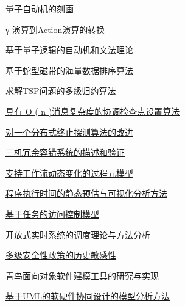 \documentclass[a4paper]{article}
\begin{document}
\href{http://www.jos.org.cn/ch/reader/download_pdf.aspx?file_no=20030102&year_id=2003&quarter_id=1&falg=1}{量子自动机的刻画}

\href{http://www.jos.org.cn/ch/reader/download_pdf.aspx?file_no=20030103&year_id=2003&quarter_id=1&falg=1}{γ 演算到Action演算的转换}

\href{http://www.jos.org.cn/ch/reader/download_pdf.aspx?file_no=20030104&year_id=2003&quarter_id=1&falg=1}{基于量子逻辑的自动机和文法理论}

\href{http://www.jos.org.cn/ch/reader/download_pdf.aspx?file_no=20030105&year_id=2003&quarter_id=1&falg=1}{基于蛇型磁带的海量数据排序算法}

\href{http://www.jos.org.cn/ch/reader/download_pdf.aspx?file_no=20030106&year_id=2003&quarter_id=1&falg=1}{求解TSP问题的多级归约算法}

\href{http://www.jos.org.cn/ch/reader/download_pdf.aspx?file_no=20030107&year_id=2003&quarter_id=1&falg=1}{具有 O ( n )消息复杂度的协调检查点设置算法}

\href{http://www.jos.org.cn/ch/reader/download_pdf.aspx?file_no=20030108&year_id=2003&quarter_id=1&falg=1}{对一个分布式终止探测算法的改进}

\href{http://www.jos.org.cn/ch/reader/download_pdf.aspx?file_no=20030109&year_id=2003&quarter_id=1&falg=1}{三机冗余容错系统的描述和验证}

\href{http://www.jos.org.cn/ch/reader/download_pdf.aspx?file_no=20030110&year_id=2003&quarter_id=1&falg=1}{支持工作流动态变化的过程元模型}

\href{http://www.jos.org.cn/ch/reader/download_pdf.aspx?file_no=20030111&year_id=2003&quarter_id=1&falg=1}{程序执行时间的静态预估与可视化分析方法}

\href{http://www.jos.org.cn/ch/reader/download_pdf.aspx?file_no=20030112&year_id=2003&quarter_id=1&falg=1}{基于任务的访问控制模型}

\href{http://www.jos.org.cn/ch/reader/download_pdf.aspx?file_no=20030113&year_id=2003&quarter_id=1&falg=1}{开放式实时系统的调度理论与方法分析}

\href{http://www.jos.org.cn/ch/reader/download_pdf.aspx?file_no=20030114&year_id=2003&quarter_id=1&falg=1}{多级安全性政策的历史敏感性}

\href{http://www.jos.org.cn/ch/reader/download_pdf.aspx?file_no=20030115&year_id=2003&quarter_id=1&falg=1}{青鸟面向对象软件建模工具的研究与实现}

\href{http://www.jos.org.cn/ch/reader/download_pdf.aspx?file_no=20030116&year_id=2003&quarter_id=1&falg=1}{基于UML的软硬件协同设计的模型分析方法}
\end{document}
